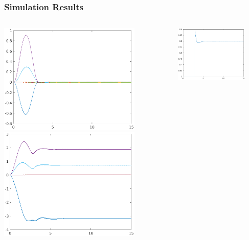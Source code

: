 \documentclass[9pt,spanish,aspectratio=1610]{beamer}
\begin{document}
\begin{frame}\frametitle{Simulation Results}
  \begin{columns}
    \begin{column}{0.5\textwidth}
      \includegraphics[width=0.8\textwidth]{Figures/est_qp.eps}
      \includegraphics[width=0.8\textwidth]{Figures/controls.eps}
    \end{column}
    \begin{column}{0.5\textwidth}
      \includegraphics[width=0.8\textwidth]{Figures/est_mass.eps}
    \end{column}
  \end{columns}
\end{frame}
\end{document}
